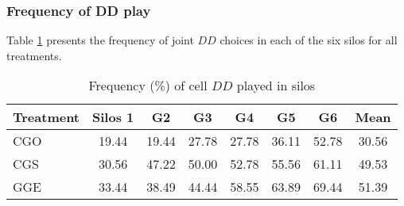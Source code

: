 \documentclass[12pt, letterpaper]{article}
\theoremstyle{plain}
\begin{document}
\subsubsection*{Frequency of DD play}
Table \ref{table:dd} presents the frequency of joint $DD$ choices in each of the six silos for all treatments. 


\begin{table}[!t]
\centering
\caption{Frequency (\%) of cell $DD$ played in silos }
\begin{tabular}{lccccccc}
\hline
Treatment & Silos 1 & G2  & G3 & G4 & G5 & G6 & Mean\\
  \hline
  CGO &  19.44 & 19.44&  27.78 & 27.78 & 36.11 & 52.78 & 30.56 \\
  CGS & 30.56 & 47.22&  50.00 & 52.78 & 55.56 & 61.11 & 49.53\\
  GGE & 33.44 & 38.49 & 44.44 & 58.55 & 63.89 & 69.44 & 51.39 \\
  \hline

\end{tabular}

\label{table:dd}
\end{table}
\end{document}
